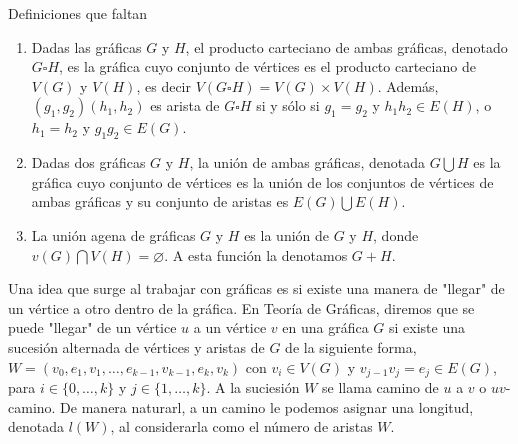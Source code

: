 \begin{definicion} Definiciones que faltan
    \begin{enumerate}
        \item Dadas las gr\'aficas $G$ y $H$, el producto carteciano de ambas
        gr\'aficas, denotado $G \square H$, es la gr\'afica cuyo conjunto de
        v\'ertices es el producto carteciano de $V(G)$ y $V(H)$, es decir $V(G
        \square H) = V(G) \times V(H)$. Adem\'as, $(g_1,g_2)(h_1,h_2)$ es arista
        de $G \square H$ si y s\'olo si $g_1 = g_2$ y $h_1h_2 \in E(H)$, o $h_1
        = h_2$ y $g_1g_2 \in E(G)$.
        \item Dadas dos gr\'aficas $G$ y $H$, la uni\'on de ambas gr\'aficas,
        denotada $G \bigcup H$ es la gr\'afica cuyo conjunto de v\'ertices es la
        uni\'on de los conjuntos de v\'ertices de ambas gr\'aficas y su conjunto
        de aristas es $E(G) \bigcup E(H)$. 
        \item La uni\'on agena de gr\'aficas $G$ y $H$ es la uni\'on de $G$ y
        $H$, donde $v(G) \bigcap V(H) = \varnothing$. A esta funci\'on la
        denotamos $G + H$. 
     \end{enumerate}
\end{definicion}



    Una idea que surge al trabajar con gr\'aficas es si existe una
    manera de "llegar" de un v\'ertice a otro dentro de la gr\'afica. En
    Teor\'ia de Gr\'aficas, diremos que se puede "llegar" de un v\'ertice $u$ a
    un v\'ertice $v$ en una gr\'afica $G$ si existe una sucesi\'on alternada de
    v\'ertices y aristas de $G$ de la siguiente forma, $W=(v_0, e_1,v_1, \dots,
    e_{k-1},v_{k-1}, e_k,v_k)$ con $v_i \in V(G)$ y $v_{j-1}v_j = e_j \in E(G)$,
    para $i \in \{0, \dots, k\}$ y $j \in \{ 1, \dots, k\}$. A la suciesi\'on
    $W$ se llama camino de  $u$ a $v$ o $uv$-camino. De manera naturarl, a un
    camino le podemos asignar una longitud, denotada $l(W)$, al considerarla
    como el n\'umero de aristas $W$. 

